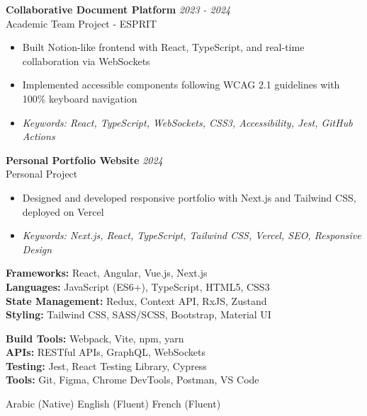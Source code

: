 \documentclass[11pt,a4paper]{article}
\begin{document}

\textbf{Collaborative Document Platform} \hfill \textit{2023 - 2024}\\[-2pt]
Academic Team Project - ESPRIT\\[-5pt]
\begin{itemize}[leftmargin=8pt,itemsep=1pt,topsep=2pt]
  \item Built Notion-like frontend with React, TypeScript, and real-time collaboration via WebSockets
  \item Implemented accessible components following WCAG 2.1 guidelines with 100\% keyboard navigation
  \item[] \textit{\footnotesize Keywords: React, TypeScript, WebSockets, CSS3, Accessibility, Jest, GitHub Actions}
\end{itemize}\vspace{3pt}

\textbf{Personal Portfolio Website} \hfill \textit{2024}\\[-2pt]
Personal Project\\[-5pt]
\begin{itemize}[leftmargin=8pt,itemsep=1pt,topsep=2pt]
  \item Designed and developed responsive portfolio with Next.js and Tailwind CSS, deployed on Vercel
  \item[] \textit{\footnotesize Keywords: Next.js, React, TypeScript, Tailwind CSS, Vercel, SEO, Responsive Design}
\end{itemize}\vspace{3pt}

{\small
\begin{minipage}[t]{0.48\textwidth}
  \textbf{Frameworks:} React, Angular, Vue.js, Next.js\\[1.5pt]
  \textbf{Languages:} JavaScript (ES6+), TypeScript, HTML5, CSS3\\[1.5pt]
  \textbf{State Management:} Redux, Context API, RxJS, Zustand\\[1.5pt]
  \textbf{Styling:} Tailwind CSS, SASS/SCSS, Bootstrap, Material UI
\end{minipage}
\hfill
\begin{minipage}[t]{0.48\textwidth}
  \textbf{Build Tools:} Webpack, Vite, npm, yarn\\[1.5pt]
  \textbf{APIs:} RESTful APIs, GraphQL, WebSockets\\[1.5pt]
  \textbf{Testing:} Jest, React Testing Library, Cypress\\[1.5pt]
  \textbf{Tools:} Git, Figma, Chrome DevTools, Postman, VS Code
\end{minipage}
}

Arabic (Native) \textbar{} English (Fluent) \textbar{} French (Fluent)
\end{document}
